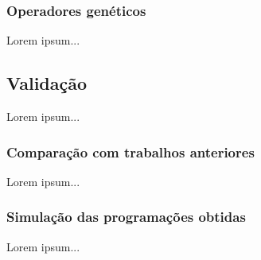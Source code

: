     \subsubsection{Operadores genéticos}
    Lorem ipsum...

\subsection{Validação}
Lorem ipsum...

    \subsubsection{Comparação com trabalhos anteriores}
    Lorem ipsum...

    \subsubsection{Simulação das programações obtidas}
    Lorem ipsum...